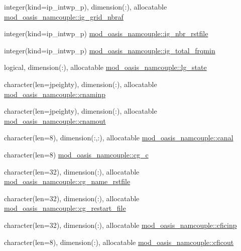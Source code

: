 \begin{DoxyCompactItemize}
\item 
integer(kind=ip\+\_\+intwp\+\_\+p), dimension(\+:), allocatable \hyperlink{namespacemod__oasis__namcouple_a8e8c38746c6c35b13d2d9b934835188c}{mod\+\_\+oasis\+\_\+namcouple\+::ig\+\_\+grid\+\_\+nbraf}
\item 
integer(kind=ip\+\_\+intwp\+\_\+p) \hyperlink{namespacemod__oasis__namcouple_a05148b30ca97c536b40a896153c8921f}{mod\+\_\+oasis\+\_\+namcouple\+::ig\+\_\+nbr\+\_\+rstfile}
\item 
integer(kind=ip\+\_\+intwp\+\_\+p) \hyperlink{namespacemod__oasis__namcouple_a839912711f8d2f44a825689e2673d0dd}{mod\+\_\+oasis\+\_\+namcouple\+::ig\+\_\+total\+\_\+frqmin}
\item 
logical, dimension(\+:), allocatable \hyperlink{namespacemod__oasis__namcouple_ac1be1629c1369b96a4ff08c07200a05d}{mod\+\_\+oasis\+\_\+namcouple\+::lg\+\_\+state}
\item 
character(len=jpeighty), dimension(\+:), allocatable \hyperlink{namespacemod__oasis__namcouple_a1f6ff08cee0c3c5deb262c1447d88328}{mod\+\_\+oasis\+\_\+namcouple\+::cnaminp}
\item 
character(len=jpeighty), dimension(\+:), allocatable \hyperlink{namespacemod__oasis__namcouple_a71ba84b9a7a813ca2551bcde99a0b5b5}{mod\+\_\+oasis\+\_\+namcouple\+::cnamout}
\item 
character(len=8), dimension(\+:,\+:), allocatable \hyperlink{namespacemod__oasis__namcouple_a5eaa67fd4db1a3cde074adedd984ffbe}{mod\+\_\+oasis\+\_\+namcouple\+::canal}
\item 
character(len=8) \hyperlink{namespacemod__oasis__namcouple_a8a7387f27c409ea27aa53b616805f0fa}{mod\+\_\+oasis\+\_\+namcouple\+::cg\+\_\+c}
\item 
character(len=32), dimension(\+:), allocatable \hyperlink{namespacemod__oasis__namcouple_ac79429a9522aabddbe4ed68fd9571bec}{mod\+\_\+oasis\+\_\+namcouple\+::cg\+\_\+name\+\_\+rstfile}
\item 
character(len=32), dimension(\+:), allocatable \hyperlink{namespacemod__oasis__namcouple_a6eec7fe795bfb9c2058c7953c072d442}{mod\+\_\+oasis\+\_\+namcouple\+::cg\+\_\+restart\+\_\+file}
\item 
character(len=32), dimension(\+:), allocatable \hyperlink{namespacemod__oasis__namcouple_af17e746f51dcf0110428ebe55f6d7285}{mod\+\_\+oasis\+\_\+namcouple\+::cficinp}
\item 
character(len=8), dimension(\+:), allocatable \hyperlink{namespacemod__oasis__namcouple_a62f96a372f013fc37713f8ba1728e3de}{mod\+\_\+oasis\+\_\+namcouple\+::cficout}

\end{DoxyCompactItemize}
